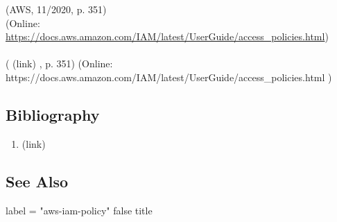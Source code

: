 (AWS, 11/2020, p. 351)\\ (Online: \url{https://docs.aws.amazon.com/IAM/latest/UserGuide/access_policies.html})  \paragraph{} (  (link) \href{AWS, 11/2020 }{ } , p. 351)  (Online:  https://docs.aws.amazon.com/IAM/latest/UserGuide/access\_policies.html  )  \subsection*{Bibliography } \begin{enumerate} \item  (link) \href{AWS, 11/2020 }{ }   \end{enumerate} \subsection*{See Also } label = "aws-iam-policy"  false  title  